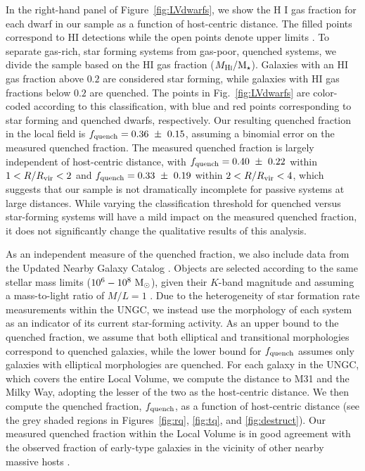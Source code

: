 In the right-hand panel of Figure~\ref{fig:LVdwarfs}, we show the H{\scriptsize
  I} gas fraction for each dwarf in our sample as a function of host-centric
distance. The filled points correspond to H{\scriptsize I} detections while the
open points denote upper limits \citep{hunter12, spekkens14, mcconnachie12}.
%
To separate gas-rich, star forming systems from gas-poor, quenched systems, we
divide the sample based on the H{\scriptsize I} gas fraction
($M_{\rm H\protect\scalebox{0.55}{\rm I}}/\mstar$). Galaxies with an
H{\scriptsize I} gas fraction above $0.2$ are considered star forming, while
galaxies with H{\scriptsize I} gas fractions below $0.2$ are quenched. The
points in Fig.~\ref{fig:LVdwarfs} are color-coded according to this
classification, with blue and red points corresponding to star forming and
quenched dwarfs, respectively.
%
Our resulting quenched fraction in the local field is
$f_{\rm quench} = 0.36~\pm~0.15$, assuming a binomial error on the measured
quenched fraction.
%
The measured quenched fraction is largely independent of host-centric distance,
with $f_{\rm quench} = 0.40~\pm~0.22$ within $1 < R/R_{\rm{vir}} < 2$ and
$f_{\rm quench} = 0.33~\pm~0.19$ within $2 < R/R_{\rm{vir}} < 4$, which suggests that
our sample is not dramatically incomplete for passive systems at large
distances.
%
While varying the classification threshold for quenched versus star-forming
systems will have a mild impact on the measured quenched fraction, it does not
significantly change the qualitative results of this analysis.



As an independent measure of the quenched fraction, we also include
data from the Updated Nearby Galaxy Catalog
\citep[UNGC,][]{karachentsev13a}.
%
Objects are selected according to the same stellar mass limits
($10^{6}-10^{8}~{\rm M}_{\odot}$), given their $K$-band magnitude and assuming a
mass-to-light ratio of $M/L = 1$ \citep{bell01}.
%
Due to the heterogeneity of star formation rate measurements within the UNGC, we
instead use the morphology of each system as an indicator of its current
star-forming activity. As an upper bound to the quenched fraction, we assume
that both elliptical and transitional morphologies correspond to quenched
galaxies, while the lower bound for $f_{\rm quench}$ assumes only galaxies with
elliptical morphologies are quenched.
%
For each galaxy in the UNGC, which covers the entire Local Volume, we compute
the distance to M31 and the Milky Way, adopting the lesser of the two as the
host-centric distance.
%
We then compute the quenched fraction, $f_{\rm quench}$, as a function of
host-centric distance (see the grey shaded regions in Figures~\ref{fig:rq},
\ref{fig:tq}, and \ref{fig:destruct}).
%
Our measured quenched fraction within the Local Volume is in good
  agreement with the observed fraction of early-type galaxies in the vicinity of
  other nearby massive hosts \citep{karachentsev15c}.






